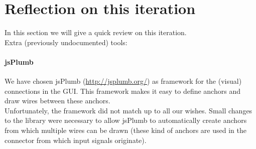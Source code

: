 \documentclass[a4paper]{article}
\begin{document}
\section{Reflection on this iteration}
In this section we will give a quick review on this iteration. \\

Extra (previously undocumented) tools:

\paragraph{jsPlumb}
We have chosen jsPlumb (\url{http://jsplumb.org/}) as framework for the (visual) connections in the GUI. This framework makes it easy to define anchors and draw wires between these anchors. \\
Unfortunately, the framework did not match up to all our wishes. Small changes to the library were necessary to allow jsPlumb to automatically create anchors from which multiple wires can be drawn (these kind of anchors are used in the connector from which input signals originate).
\end{document}
